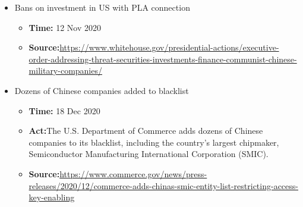 \begin{itemize}
			\item Bans on investment in US with PLA connection
				\begin{itemize}
				\item \textbf{Time:} 12 Nov 2020
				\item \textbf{Source:}\url{https://www.whitehouse.gov/presidential-actions/executive-order-addressing-threat-securities-investments-finance-communist-chinese-military-companies/}
				\end{itemize}
			
			\item Dozens of Chinese companies added to blacklist
				\begin{itemize}
				\item \textbf{Time:} 18 Dec 2020
				\item \textbf{Act:}The U.S. Department of Commerce adds dozens of Chinese companies to its blacklist, including the country’s largest chipmaker, Semiconductor Manufacturing International Corporation (SMIC).
				\item \textbf{Source:}\url{https://www.commerce.gov/news/press-releases/2020/12/commerce-adds-chinas-smic-entity-list-restricting-access-key-enabling}
				\end{itemize}
			\end{itemize}
		
		
			
